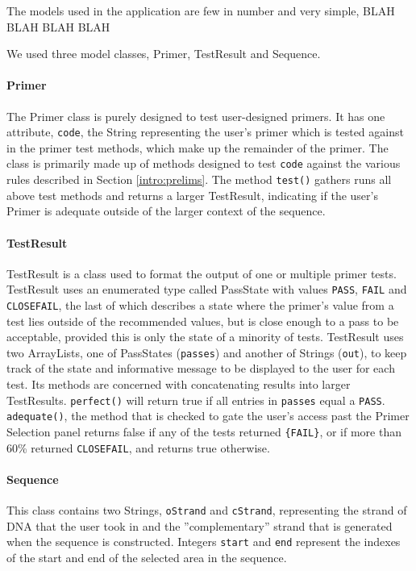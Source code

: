 

The models used in the application are few in number and very simple, BLAH BLAH BLAH BLAH

We used three model classes, Primer, TestResult and Sequence.

\paragraph{Primer}
The Primer class is purely designed to test user-designed primers. It has one attribute, \verb£code£, the String representing the user's primer
which is tested against in the primer test methods, which make up the remainder of the primer. The class is primarily made up of methods designed
to test \verb£code£ against the various rules described in Section \ref{intro:prelims}. The method \verb£test()£ gathers runs all above test methods
and returns a larger TestResult, indicating if the user's Primer is adequate outside of the larger context of the sequence.

\paragraph{TestResult}
TestResult is a class used to format the output of one or multiple primer tests. TestResult uses an enumerated type called PassState with values
\verb£PASS£, \verb£FAIL£ and \verb£CLOSEFAIL£, the last of which describes a state where the primer's value from a test lies outside of the recommended
values, but is close enough to a pass to be acceptable, provided this is only the state of a minority of tests. TestResult uses two ArrayLists, one of
PassStates (\verb£passes£) and another of Strings (\verb£out£), to keep track of the state and informative message to be displayed to the user for each test. Its methods are concerned with concatenating results into larger TestResults. \verb£perfect()£ will return true if all entries in \verb£passes£ equal a \verb£PASS£.
\verb£adequate()£, the method that is checked to gate the user's access past the Primer Selection panel returns false if any of the tests returned \verb£{FAIL}£,
or if more than 60\% returned \verb£CLOSEFAIL£, and returns true otherwise.

%
\paragraph{Sequence}
This class contains two Strings, \verb£oStrand£ and \verb£cStrand£, representing the strand of DNA that the user took in and the ''complementary'' strand that
is generated when the sequence is constructed. Integers \verb£start£ and \verb£end£ represent the indexes of the start and end of the selected area in the
sequence.
